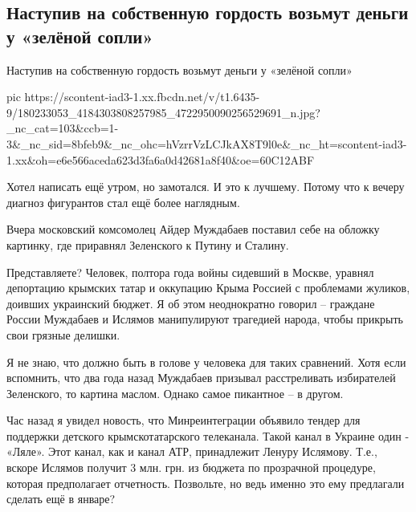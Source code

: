  
 
 
 
 

\subsection{Наступив на собственную гордость возьмут деньги у «зелёной сопли»}
\label{sec:30_04_2021.fb.romanenko_jurij.1.muzhdabajev_ajder}

Наступив на собственную гордость возьмут деньги у «зелёной сопли»


\ifcmt
  pic https://scontent-iad3-1.xx.fbcdn.net/v/t1.6435-9/180233053_4184303808257985_4722950090256529691_n.jpg?_nc_cat=103&ccb=1-3&_nc_sid=8bfeb9&_nc_ohc=hVzrrVzLCJkAX8T9l0e&_nc_ht=scontent-iad3-1.xx&oh=e6e566aceda623d3fa6a0d42681a8f40&oe=60C12ABF
\fi


Хотел написать ещё утром, но замотался. И это к лучшему. Потому что к вечеру
диагноз фигурантов стал ещё более наглядным.

Вчера московский комсомолец Айдер Муждабаев поставил себе на обложку картинку, где приравнял Зеленского к Путину и Сталину. 

Представляете? Человек, полтора года войны сидевший в Москве, уравнял
депортацию крымских татар и оккупацию Крыма Россией с проблемами жуликов,
доивших украинский бюджет. Я об этом неоднократно говорил – граждане России
Муждабаев и Ислямов манипулируют трагедией народа, чтобы прикрыть свои грязные
делишки.

Я не знаю, что должно быть в голове у человека для таких сравнений. Хотя если
вспомнить, что два года назад Муждабаев призывал расстреливать избирателей
Зеленского, то картина маслом. Однако самое пикантное – в другом.

Час назад я увидел новость, что Минреинтеграции объявило тендер для поддержки
детского крымскотатарского телеканала. Такой канал в Украине один - «Ляле».
Этот канал, как и канал АТР, принадлежит Ленуру Ислямову. Т.е., вскоре Ислямов
получит 3 млн. грн. из бюджета по прозрачной процедуре, которая предполагает
отчетность. Позвольте, но ведь именно это ему предлагали сделать ещё в январе? 

